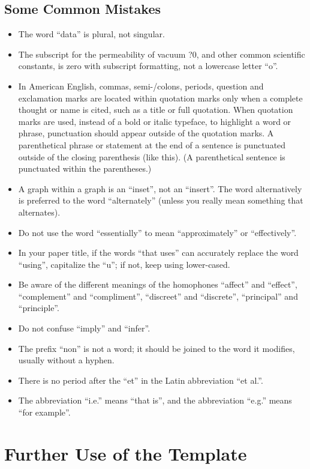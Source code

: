 \documentclass[a4paper, 10pt, conference]{ieeeconf}      %
\begin{document}
\subsection{Some Common Mistakes}
\begin{itemize}


\item The word ``data'' is plural, not singular.
\item The subscript for the permeability of vacuum ?0, and other common scientific constants, is zero with subscript formatting, not a lowercase letter ``o''.
\item In American English, commas, semi-/colons, periods, question and exclamation marks are located within quotation marks only when a complete thought or name is cited, such as a title or full quotation. When quotation marks are used, instead of a bold or italic typeface, to highlight a word or phrase, punctuation should appear outside of the quotation marks. A parenthetical phrase or statement at the end of a sentence is punctuated outside of the closing parenthesis (like this). (A parenthetical sentence is punctuated within the parentheses.)
\item A graph within a graph is an ``inset'', not an ``insert''. The word alternatively is preferred to the word ``alternately'' (unless you really mean something that alternates).
\item Do not use the word ``essentially'' to mean ``approximately'' or ``effectively''.
\item In your paper title, if the words ``that uses'' can accurately replace the word ``using'', capitalize the ``u''; if not, keep using lower-cased.
\item Be aware of the different meanings of the homophones ``affect'' and ``effect'', ``complement'' and ``compliment'', ``discreet'' and ``discrete'', ``principal'' and ``principle''.
\item Do not confuse ``imply'' and ``infer''.
\item The prefix ``non'' is not a word; it should be joined to the word it modifies, usually without a hyphen.
\item There is no period after the ``et'' in the Latin abbreviation ``et al.''.
\item The abbreviation ``i.e.'' means ``that is'', and the abbreviation ``e.g.'' means ``for example''.

\end{itemize}

\section{Further Use of the Template}
\end{document}
